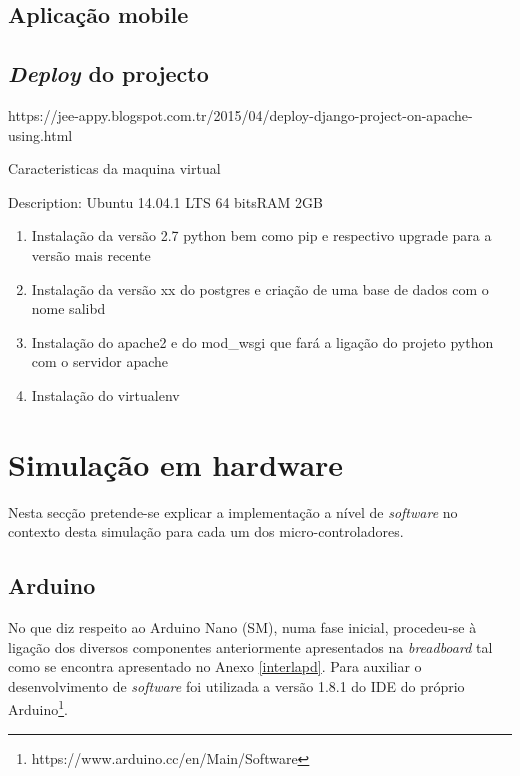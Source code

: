 \subsection{Aplicação mobile}




\subsection{\textit{Deploy} do projecto}


https://jee-appy.blogspot.com.tr/2015/04/deploy-django-project-on-apache-using.html

Caracteristicas da maquina virtual

Description:	Ubuntu 14.04.1 LTS
64 bitsRAM 2GB 


\begin{enumerate}
	\item Instalação da versão 2.7 python bem como pip e respectivo upgrade para a versão mais recente
	\item Instalação da versão xx do postgres e criação de uma base de dados com o nome salibd
	\item Instalação do apache2 e do mod\_wsgi que fará a ligação do projeto python com o servidor apache
	\item Instalação do virtualenv 
\end{enumerate}





\newpage
\section{Simulação em hardware}

Nesta secção pretende-se explicar a implementação a nível de \textit{software} no contexto desta simulação para cada um dos micro-controladores. 


\subsection{Arduino}

No que diz respeito ao Arduino Nano (\ac{SM}), numa fase inicial,  procedeu-se à ligação dos diversos componentes anteriormente apresentados na \textit{breadboard} tal como se encontra apresentado no Anexo \ref{interlapd}. Para auxiliar o desenvolvimento de \textit{software} foi utilizada a versão 1.8.1 do \ac{IDE} do próprio Arduino\footnote{https://www.arduino.cc/en/Main/Software}.  

